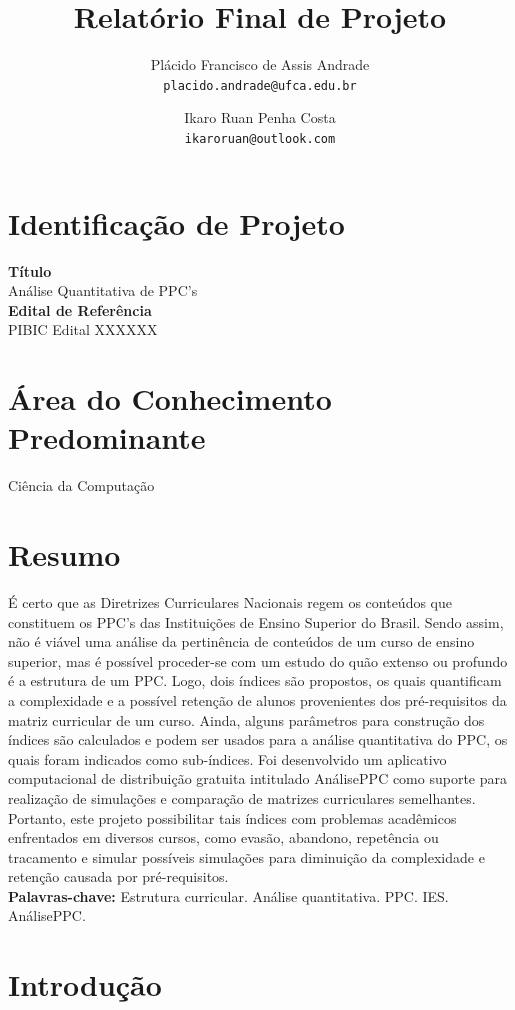 \documentclass[a4paper, 12pt]{article}
\title{Relatório Final de Projeto}
\author{Plácido Francisco de Assis Andrade\\ 
	\texttt{placido.andrade@ufca.edu.br} 
	\and 
	Ikaro Ruan Penha Costa \\
	\texttt{ikaroruan@outlook.com}
	}
\date{}
\begin{document}
\maketitle


\section*{Identificação de Projeto}
\textbf{Título} \\
Análise Quantitativa de PPC's \\

\noindent \textbf{Edital de Referência} \\
PIBIC Edital XXXXXX \\

\section*{Área do Conhecimento Predominante}
Ciência da Computação

\onehalfspace
\section*{Resumo}

É certo que as Diretrizes Curriculares Nacionais regem os conteúdos que constituem os PPC's das Instituições de Ensino Superior do Brasil. Sendo assim, não 
é viável uma análise da pertinência de conteúdos de um curso de ensino superior, mas é possível proceder-se com um estudo do quão extenso ou profundo é a 
estrutura de um PPC. Logo, dois índices são propostos, os quais quantificam a complexidade e a possível retenção de alunos provenientes dos pré-requisitos da 
matriz curricular de um curso. Ainda, alguns parâmetros para construção dos índices são calculados e podem ser usados para a análise quantitativa do PPC, os quais 
foram indicados como sub-índices. Foi desenvolvido um aplicativo computacional de distribuição gratuita intitulado AnálisePPC como suporte para realização de 
simulações e comparação de matrizes curriculares semelhantes. Portanto, este projeto possibilitar tais índices com problemas acadêmicos enfrentados em diversos 
cursos, como evasão, abandono, repetência ou tracamento e simular possíveis simulações para diminuição da complexidade e retenção causada por pré-requisitos. \\

\textbf{Palavras-chave:} Estrutura curricular. Análise quantitativa. PPC. IES. AnálisePPC.

\section*{Introdução}
\end{document}
